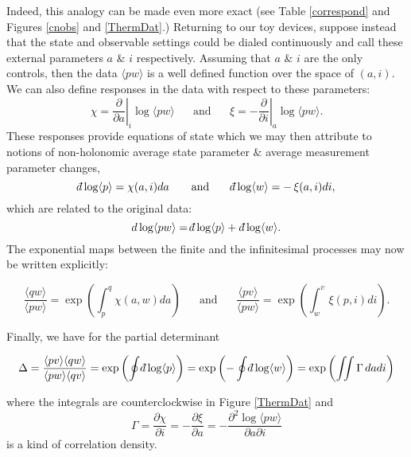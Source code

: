 \documentclass[pra, 10pt, notitlepage, twocolumn]{revtex4-1}
\def\dbar{{\mathchar'26\mkern-12mu d}}
\begin{document}
Indeed, this analogy can be made even more exact (see Table \ref{correspond} and Figures \ref{cnobs} and \ref{ThermDat}.)
Returning to our toy devices, suppose instead that the state and observable settings could be dialed continuously and call these external parameters $a$ \& $i$ respectively.
Assuming that $a$ \& $i$ are the only controls, then the data $\langle p w \rangle$ is a well defined function over the space of $(a,i)$.
We can also define responses in the data with respect to these parameters:
\begin{equation}
	\chi = \left.\frac{\partial}{\partial a}\right|_i \!\!\!\log \langle pw \rangle
	\hspace{20pt}
	\text{and}
	\hspace{20pt}
	\xi = -\left.\frac{\partial}{\partial i}\right|_a \!\!\log \langle pw \rangle.
\end{equation}
These responses provide equations of state which we may then attribute to notions of non-holonomic average state parameter \& average measurement parameter changes,
\begin{equation}
	\dbar \log \langle p \rangle = \chi (a,i)d a
	\hspace{20pt}
	\text{and}
	\hspace{20pt}
	\dbar \log \langle w \rangle = -\,\xi (a,i)d i,
\end{equation}
which are related to the original data:
\begin{equation}\label{inexact}
	d \log \langle p w \rangle= \dbar \log \langle p \rangle +\,\dbar \log \langle w \rangle.
\end{equation}
The exponential maps between the finite and the infinitesimal processes may now be written explicitly:
\begin{widetext}

\begin{equation}
	\frac{\langle q w \rangle}{\langle p w \rangle}
	=
	\exp\left(\int_p^q \!\!\chi(a,w) da\right)
	\hspace{20pt}
	\text{and}
	\hspace{20pt}
	\frac{\langle p v  \rangle}{\langle p w \rangle}
	=
	\exp\left(\int_w^v \!\!\xi(p,i) di\right).
\end{equation}

\end{widetext}
Finally, we have for the partial determinant
\begin{widetext}

\begin{equation}
	\Delta = \frac{\langle p v \rangle\langle q w \rangle}{\langle p w \rangle\langle q v \rangle} = \exp\left(\oint \dbar \log \langle p \rangle\right) = \exp\left(-\oint \dbar \log \langle w \rangle\right) = \exp\left(\iint \Gamma\, da di\right)
\end{equation}

\end{widetext}
where the integrals are counterclockwise in Figure \ref{ThermDat} and
\begin{equation}\label{meas?}
	\Gamma = \frac{\partial \chi}{\partial i} =  -\frac{\partial \xi}{\partial a} = -\frac{\partial^2 \log \langle pw \rangle}{\partial a\partial i}
\end{equation}
is a kind of correlation density.
\end{document}
